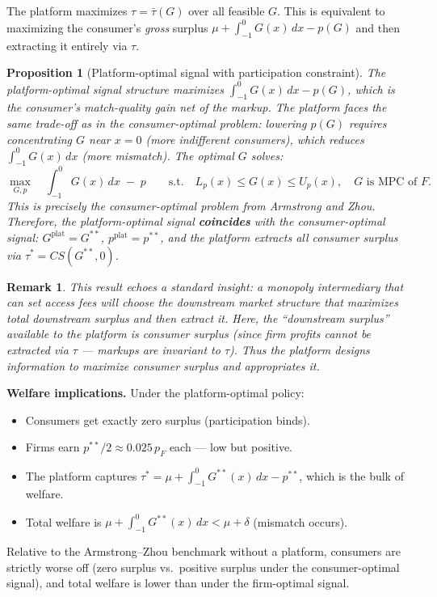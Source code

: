 \documentclass[12pt, a4paper]{article}
\newtheorem{proposition}{Proposition}
\newtheorem{remark}{Remark}
\begin{document}
The platform maximizes $\tau = \bar{\tau}(G)$ over all feasible $G$. This is equivalent to maximizing the consumer's \emph{gross} surplus $\mu + \int_{-1}^0 G(x)\,dx - p(G)$ and then extracting it entirely via $\tau$.

\begin{proposition}[Platform-optimal signal with participation constraint]
The platform-optimal signal structure maximizes $\int_{-1}^{0} G(x)\,dx - p(G)$, which is the consumer's match-quality gain net of the markup. The platform faces the same trade-off as in the consumer-optimal problem: lowering $p(G)$ requires concentrating $G$ near $x = 0$ (more indifferent consumers), which reduces $\int_{-1}^0 G(x)\,dx$ (more mismatch). The optimal $G$ solves:
\begin{equation}
    \max_{G, p} \quad \int_{-1}^{0} G(x)\,dx \;-\; p \qquad \text{s.t.} \quad L_p(x) \leq G(x) \leq U_p(x), \quad G \text{ is MPC of } F.
\end{equation}
This is precisely the consumer-optimal problem from Armstrong and Zhou. Therefore, the platform-optimal signal \textbf{coincides} with the consumer-optimal signal: $G^{\text{plat}} = G^{**}$, $p^{\text{plat}} = p^{**}$, and the platform extracts all consumer surplus via $\tau^* = CS(G^{**}, 0)$.
\end{proposition}

\begin{remark}
This result echoes a standard insight: a monopoly intermediary that can set access fees will choose the downstream market structure that maximizes total downstream surplus and then extract it. Here, the ``downstream surplus'' available to the platform is consumer surplus (since firm profits cannot be extracted via $\tau$ --- markups are invariant to $\tau$). Thus the platform designs information to maximize consumer surplus and appropriates it.
\end{remark}

\textbf{Welfare implications.} Under the platform-optimal policy:
\begin{itemize}[nosep]
    \item Consumers get exactly zero surplus (participation binds).
    \item Firms earn $p^{**}/2 \approx 0.025\, p_F$ each --- low but positive.
    \item The platform captures $\tau^* = \mu + \int_{-1}^0 G^{**}(x)\,dx - p^{**}$, which is the bulk of welfare.
    \item Total welfare is $\mu + \int_{-1}^0 G^{**}(x)\,dx < \mu + \delta$ (mismatch occurs).
\end{itemize}
Relative to the Armstrong--Zhou benchmark without a platform, consumers are strictly worse off (zero surplus vs.\ positive surplus under the consumer-optimal signal), and total welfare is lower than under the firm-optimal signal.
\end{document}
